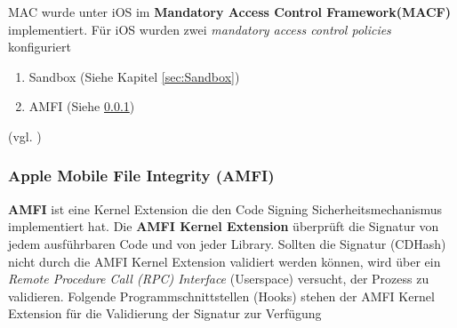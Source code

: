 MAC wurde unter iOS im \textbf{Mandatory Access Control Framework(MACF)} implementiert. Für iOS wurden zwei \textit{\glqq mandatory access control policies\grqq{}} konfiguriert
\begin{enumerate}
   \item Sandbox (Siehe Kapitel \ref{sec:Sandbox})
   \item AMFI (Siehe \ref{sec:AMFI})
\end{enumerate}
(vgl. \cite{iOSSec[5], Hacking[1]})

\subsubsection{Apple Mobile File Integrity (AMFI)}
\label{sec:AMFI}
\textbf{AMFI } ist eine Kernel Extension die den Code Signing Sicherheitsmechanismus implementiert hat. Die \textbf{AMFI Kernel Extension} überprüft die Signatur von jedem ausführbaren Code und von jeder Library. Sollten die Signatur (CDHash) nicht durch die AMFI Kernel Extension validiert werden können, wird über ein \textit{\glqq Remote Procedure Call (RPC) Interface\grqq{}} (Userspace) versucht, der Prozess zu validieren. Folgende Programmschnittstellen (Hooks) stehen der AMFI Kernel Extension für die Validierung der Signatur zur Verfügung

